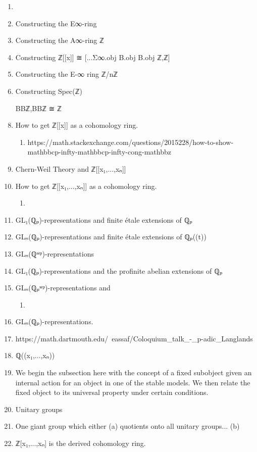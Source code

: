 \documentclass{book}
\begin{document}
\begin{enumerate}
\item 
\item Constructing the E∞-ring
\item Constructing the A∞-ring ℤ
\item Constructing  ℤ[[x]] ≅ [...Σ∞.obj B.obj B.obj ℤ,ℤ]
\item Constructing the E-∞ ring ℤ/nℤ
\item Constructing Spec(ℤ)
\item [BBℤ,BBℤ] ≅ ℤ
\item How to get ℤ[[x]] as a cohomology ring.
\begin{enumerate}
\item https://math.stackexchange.com/questions/2015228/how-to-show-mathbbcp-infty-mathbbcp-infty-cong-mathbbz
\end{enumerate}
\item Chern-Weil Theory and  ℤ[[x₁,...,xₙ]]
\item How to get ℤ[[x₁,...,xₙ]] as a cohomology ring.
\begin{enumerate}
\item 
\end{enumerate}
\item GL₁(ℚₚ)-representations and finite étale extensions of ℚₚ
\item GLₙ(ℚₚ)-representations and finite étale extensions of ℚₚ((t))
\item GLₙ(ℚˢᵉᵖ)-representations
\item GL₁(ℚₚ)-representations and the profinite abelian extensions of ℚₚ
\item GLₙ(ℚₚˢᵉᵖ)-representations and 
\begin{enumerate}
\item 
\end{enumerate}
\item GLₙ(ℚₚ)-representations.
\item https://math.dartmouth.edu/~eassaf/Coloquium_talk_-_p-adic_Langlands
\item ℚ((x₁,...,xₙ))
\item We begin the subsection here with the concept of a fixed subobject given an internal action for an object in one of the stable models. We then relate the fixed object to its universal property under certain conditions.
\item Unitary groups
\item One giant group which either (a) quotients onto all unitary groups... (b)
\item ℤ[x₁,...,xₙ] is the derived cohomology ring.

\end{enumerate}
\end{document}
